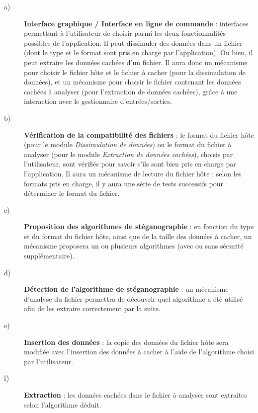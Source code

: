 \documentclass[11pt]{article}
\begin{document}
\begin{description}
\item[a)] \textbf{Interface graphique / Interface en ligne de commande} :
    interfaces permettant à l'utilisateur de choisir parmi les deux
    fonctionnalités possibles de l'application. Il peut dissimuler des
    données dans un fichier (dont le type et le format sont pris en charge
    par l'application). Ou bien, il peut extraire les données cachées d'un
    fichier. \newline
    Il aura donc un mécanisme pour choisir le fichier hôte et le fichier 
    à cacher (pour la dissimulation de données), et un mécanisme pour choisir le 
    fichier contenant les données cachées à analyser (pour l'extraction de 
    données cachées), grâce à une interaction avec le gestionnaire d’entrées/sorties. 

\item[b)] \textbf{Vérification de la compatibilité des fichiers} : le format 
	du fichier hôte (pour le module \textit{Dissimulation de données}) ou 
	le format du fichier à analyser (pour le module \textit{Extraction de données 
	cachées}), choisis par l'utilisateur, sont vérifiés pour savoir s'ils sont
	bien pris en charge par l'application. \newline
	Il aura un mécanisme de lecture du fichier hôte : selon les formats 
	pris en charge, il y aura une série de tests successifs pour déterminer le 
	format du fichier. 

\item[c)] \textbf{Proposition des algorithmes de stéganographie} : en fonction
    du type et du format du fichier hôte, ainsi que de la taille des données à
    cacher, un mécanisme proposera un ou plusieurs algorithmes (avec ou sans 
    sécurité supplémentaire).  

\item[d)] \textbf{Détection de l'algorithme de stéganographie} : un mécanisme 
	d'analyse du fichier permettra de découvrir quel algorithme a été utilisé 
	afin de les extraire correctement par la suite. 

\item[e)] \textbf{Insertion des données} : la copie des données du fichier hôte
    sera modifiée avec l'insertion des données à cacher à l'aide de l'algorithme
    choisi par l'utilisateur. 

\item[f)] \textbf{Extraction} : les données cachées dans le fichier à analyser
    sont extraites selon l'algorithme déduit.

\end{description}
\end{document}
